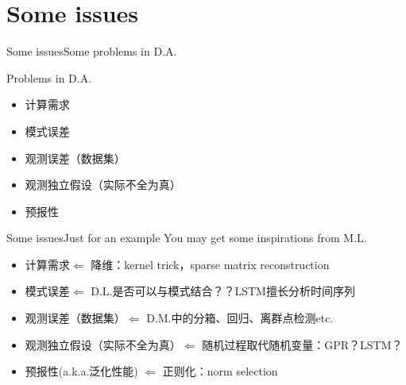 \documentclass{beamer}
\begin{document}
%
%
%
%
%
%
%
%


\section{Some issues}


\begin{frame}{Some issues}{\quad \quad \quad Some problems in D.A. }


Problems in D.A.
\begin{itemize}
\item 计算需求
\item 模式误差
\item 观测误差（数据集）
\item 观测独立假设（实际不全为真）
\item 预报性
\end{itemize}

\end{frame}

\begin{frame}{Some issues}{\quad \quad \quad Just for an example}
You may get some inspirations from M.L.

\begin{itemize}
\item 计算需求$\Leftarrow$ 降维：kernel trick，sparse matrix reconstruction
\item 模式误差$\Leftarrow$ D.L.是否可以与模式结合？？LSTM擅长分析时间序列
\item 观测误差（数据集）$\Leftarrow$ D.M.中的分箱、回归、离群点检测etc.
\item 观测独立假设（实际不全为真）$\Leftarrow$ 随机过程取代随机变量：GPR？LSTM？
\item 预报性(a.k.a.泛化性能) $\Leftarrow$ 正则化：norm selection
\end{itemize}

\end{frame}
\end{document}
